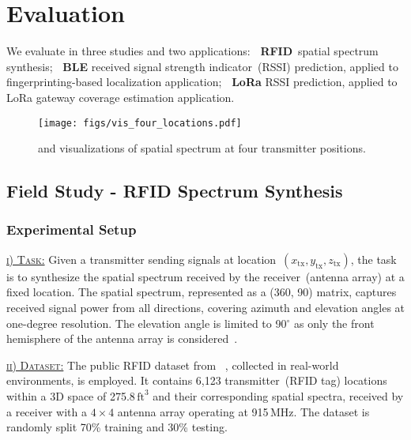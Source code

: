 
\section{Evaluation}\label{sec_evaluation}

We evaluate \ourSystem in three studies and two applications:
\textbf{\textbullet~RFID}~spatial spectrum synthesis;
\textbf{\textbullet~BLE} received signal strength indicator~(RSSI) prediction, applied to fingerprinting-based localization application;
\textbf{\textbullet~LoRa} RSSI prediction, applied to LoRa gateway coverage estimation application.




\begin{figure}[t]
\centering
{\texttt{[image: figs/vis\_four\_locations.pdf]}}
	\vspace{5pt}
\caption{\nerft and \ourSystem visualizations of spatial spectrum at four transmitter positions.}
    \Description[]{}
	\label{fig_vis_d1}
\end{figure}


\subsection{Field Study - RFID Spectrum Synthesis}\label{sec_overall_rfid}


\subsubsection{Experimental Setup}
\underline{\textsc{i) Task:}}
Given a transmitter sending signals at location~$\left(x_{\text{tx}}, y_{\text{tx}}, z_{\text{tx}}\right)$, the task is to synthesize the spatial spectrum received by the receiver~(antenna array) at a fixed location.  
The spatial spectrum, represented as a (360, 90) matrix, captures received signal power from all directions, covering azimuth and elevation angles at one-degree resolution.
The elevation angle is limited to 90$^\circ$ as only the front hemisphere of the antenna array is considered~\cite{zhao2023nerf}.  


\underline{\textsc{ii) Dataset:}}
The public RFID dataset from \nerft~\cite{zhao2023nerf}, collected in real-world environments, is employed.  
It contains 6,123 transmitter~(RFID tag) locations within a 3D space of 275.8\,$\text{ft}^3$ and their corresponding spatial spectra, received by a receiver with a $4 \times 4$ antenna array operating at 915\,MHz.
The dataset is randomly split 70\% training and 30\% testing.  


